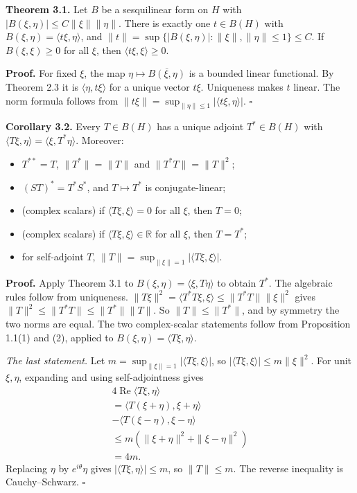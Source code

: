 \documentclass[
  english,
  11pt,
  a4paper,
]{article}
\providecommand{\tightlist}{%
  \setlength{\itemsep}{0pt}\setlength{\parskip}{0pt}}
\begin{document}
\textbf{Theorem 3.1.} Let \(B\) be a sesquilinear form on \(H\) with
\(|B(\xi,\eta)|\le C\|\xi\|\|\eta\|\). There is exactly one
\(t\in B(H)\) with \(B(\xi,\eta)=\langle t\xi,\eta\rangle\), and
\(\|t\|=\sup\{|B(\xi,\eta)|:\|\xi\|,\|\eta\|\le1\}\le C\). If
\(B(\xi,\xi)\ge0\) for all \(\xi\), then
\(\langle t\xi,\xi\rangle\ge0\).

\textbf{Proof.} For fixed \(\xi\), the map
\(\eta\mapsto\overline{B(\xi,\eta)}\) is a bounded linear functional. By
Theorem 2.3 it is \(\langle\eta,t\xi\rangle\) for a unique vector
\(t\xi\). Uniqueness makes \(t\) linear. The norm formula follows from
\(\|t\xi\|=\sup_{\|\eta\|\le1}|\langle t\xi,\eta\rangle|\). \(\square\)

\textbf{Corollary 3.2.} Every \(T\in B(H)\) has a unique adjoint
\(T^*\in B(H)\) with
\(\langle T\xi,\eta\rangle=\langle\xi,T^*\eta\rangle\). Moreover:

\begin{itemize}
\tightlist
\item
  \(T^{**}=T\), \(\|T^*\|=\|T\|\) and \(\|T^*T\|=\|T\|^2\);
\item
  \((ST)^*=T^*S^*\), and \(T\mapsto T^*\) is conjugate-linear;
\item
  (complex scalars) if \(\langle T\xi,\xi\rangle=0\) for all \(\xi\),
  then \(T=0\);
\item
  (complex scalars) if \(\langle T\xi,\xi\rangle\in\mathbb R\) for all
  \(\xi\), then \(T=T^*\);
\item
  for self-adjoint \(T\),
  \(\|T\|=\sup_{\|\xi\|=1}|\langle T\xi,\xi\rangle|\).
\end{itemize}

\textbf{Proof.} Apply Theorem 3.1 to
\(B(\xi,\eta)=\langle\xi,T\eta\rangle\) to obtain \(T^*\). The algebraic
rules follow from uniqueness.
\(\|T\xi\|^2=\langle T^*T\xi,\xi\rangle\le\|T^*T\|\|\xi\|^2\) gives
\(\|T\|^2\le\|T^*T\|\le\|T^*\|\|T\|\). So \(\|T\|\le\|T^*\|\), and by
symmetry the two norms are equal. The two complex-scalar statements
follow from Proposition 1.1(1) and (2), applied to
\(B(\xi,\eta)=\langle T\xi,\eta\rangle\).

\emph{The last statement.} Let
\(m=\sup_{\|\xi\|=1}|\langle T\xi,\xi\rangle|\), so
\(|\langle T\xi,\xi\rangle|\le m\|\xi\|^2\). For unit \(\xi,\eta\),
expanding and using self-adjointness gives \[\begin{gathered}
4\operatorname{Re}\langle T\xi,\eta\rangle\\
=\langle T(\xi+\eta),\xi+\eta\rangle\\
-\langle T(\xi-\eta),\xi-\eta\rangle\\
\le m(\|\xi+\eta\|^2+\|\xi-\eta\|^2)\\
=4m.
\end{gathered}\] Replacing \(\eta\) by \(e^{i\theta}\eta\) gives
\(|\langle T\xi,\eta\rangle|\le m\), so \(\|T\|\le m\). The reverse
inequality is Cauchy--Schwarz. \(\square\)
\end{document}
